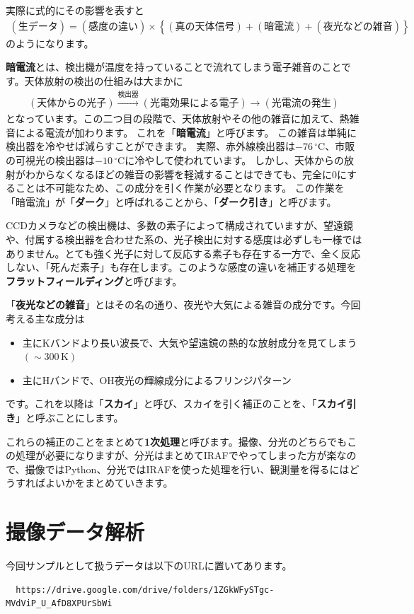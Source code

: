 実際に式的にその影響を表すと
\begin{align}
  (\text{生データ}) =  (\text{感度の違い}) \times \left\{  (\text{真の天体信号})+(\text{暗電流})+(夜光などの雑音) \right\}\label{eq:nama_data}
\end{align}
のようになります。\par
\textbf{暗電流}とは、検出機が温度を持っていることで流れてしまう電子雑音のことです。天体放射の検出の仕組みは大まかに
\begin{align*}
  (\text{天体からの光子}) \xrightarrow{\text{検出器}} (\text{光電効果による電子}) \rightarrow (\text{光電流の発生})
\end{align*}
となっています。この二つ目の段階で、天体放射やその他の雑音に加えて、熱雑音による電流が加わります。
これを「\textbf{暗電流}」と呼びます。
この雑音は単純に検出器を冷やせば減らすことができます。
実際、赤外線検出器は$-76\,\mathrm{{}^\circ C}$、市販の可視光の検出器は$-10\,\mathrm{{}^\circ C}$に冷やして使われています。
しかし、天体からの放射がわからなくなるほどの雑音の影響を軽減することはできても、完全に$0$にすることは不可能なため、この成分を引く作業が必要となります。
この作業を「暗電流」が「\textbf{ダーク}」と呼ばれることから、「\textbf{ダーク引き}」と呼びます。\par
CCDカメラなどの検出機は、多数の素子によって構成されていますが、望遠鏡や、付属する検出器を合わせた系の、光子検出に対する感度は必ずしも一様ではありません。とても強く光子に対して反応する素子も存在する一方で、全く反応しない、「死んだ素子」も存在します。このような感度の違いを補正する処理を\textbf{フラットフィールディング}と呼びます。\par
「\textbf{夜光などの雑音}」とはその名の通り、夜光や大気による雑音の成分です。今回考える主な成分は
\begin{itemize}
  \item 主にKバンドより長い波長で、大気や望遠鏡の熱的な放射成分を見てしまう$(\sim300\,\mathrm{K})$
  \item 主にHバンドで、OH夜光の輝線成分によるフリンジパターン
\end{itemize}
です。これを以降は「\textbf{スカイ}」と呼び、スカイを引く補正のことを、「\textbf{スカイ引き}」と呼ぶことにします。\par
これらの補正のことをまとめて\textbf{1次処理}と呼びます。撮像、分光のどちらでもこの処理が必要になりますが、分光はまとめてIRAFでやってしまった方が楽なので、撮像ではPython、分光ではIRAFを使った処理を行い、観測量を得るにはどうすればよいかをまとめていきます。

\section{撮像データ解析} %
\label{sect:photo_ana}
今回サンプルとして扱うデータは以下のURLに置いてあります。
\begin{verbatim}
  https://drive.google.com/drive/folders/1ZGkWFySTgc-MVdViP_U_AfD8XPUrSbWi
\end{verbatim}

